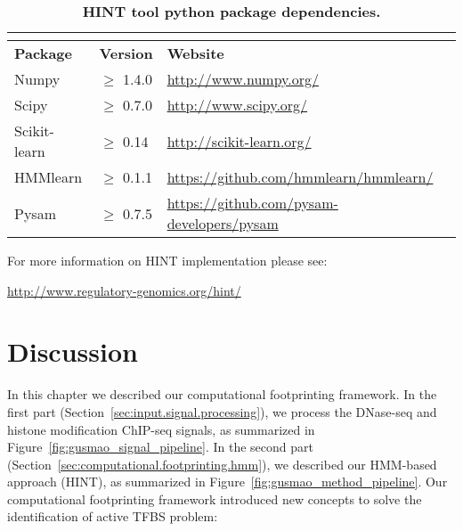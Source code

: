 \begin{longtable}{>{\raggedright\arraybackslash}p{2.5cm}>{\raggedright\arraybackslash}p{1.2cm}>{\raggedright\arraybackslash}p{9.8cm}}
\caption[HINT tool python package dependencies]{\textbf{HINT tool python package dependencies.}} \\
\label{tab:package.dependency} \\[-0.8cm]
  \hline
  \textbf{Package} & \textbf{Version} & \textbf{Website} \\
  \hline
  Numpy & $\geq$ 1.4.0 & \url{http://www.numpy.org/} \\
  Scipy & $\geq$ 0.7.0 & \url{http://www.scipy.org/} \\
  Scikit-learn & $\geq$ 0.14 & \url{http://scikit-learn.org/} \\
  HMMlearn & $\geq$ 0.1.1 & \url{https://github.com/hmmlearn/hmmlearn/} \\
  Pysam & $\geq$ 0.7.5 & \url{https://github.com/pysam-developers/pysam} \\
  \hline
\end{longtable}

For more information on HINT implementation please see:

\begin{center}
\url{http://www.regulatory-genomics.org/hint/}
\end{center}


\section{Discussion}
\label{sec:discussion.3}

In this chapter we described our computational footprinting framework. In the first part (Section~\ref{sec:input.signal.processing}), we process the DNase-seq and histone modification ChIP-seq signals, as summarized in Figure~\ref{fig:gusmao_signal_pipeline}. In the second part (Section~\ref{sec:computational.footprinting.hmm}), we described our HMM-based approach (HINT), as summarized in Figure~\ref{fig:gusmao_method_pipeline}. Our computational footprinting framework introduced new concepts to solve the identification of active TFBS problem:

